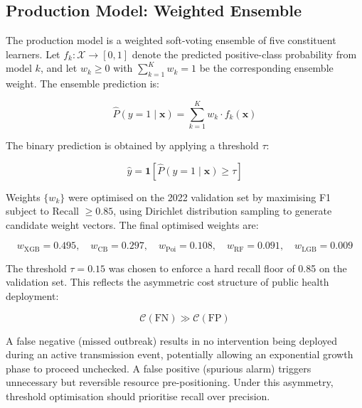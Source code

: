 \documentclass[conference]{IEEEtran}
\begin{document}
\subsection{Production Model: Weighted Ensemble}
\label{subsec:ensemble}

The production model is a weighted soft-voting ensemble of five
constituent learners. Let $f_k : \mathcal{X} \to [0,1]$ denote
the predicted positive-class probability from model $k$, and let
$w_k \geq 0$ with $\sum_{k=1}^{K} w_k = 1$ be the corresponding
ensemble weight. The ensemble prediction is:

\begin{equation}
  \hat{P}(y=1 \mid \mathbf{x}) = \sum_{k=1}^{K} w_k \cdot f_k(\mathbf{x})
  \label{eq:ensemble}
\end{equation}

The binary prediction is obtained by applying a threshold $\tau$:

\begin{equation}
  \hat{y} = \mathbf{1}\!\left[\hat{P}(y=1 \mid \mathbf{x}) \geq \tau\right]
  \label{eq:threshold}
\end{equation}

Weights $\{w_k\}$ were optimised on the 2022 validation set by
maximising F1 subject to Recall $\geq 0.85$, using Dirichlet
distribution sampling to generate candidate weight vectors. The
final optimised weights are:

\begin{equation}
  w_{\text{XGB}} = 0.495,\quad
  w_{\text{CB}}  = 0.297,\quad
  w_{\text{Poi}} = 0.108,\quad
  w_{\text{RF}}  = 0.091,\quad
  w_{\text{LGB}} = 0.009
  \label{eq:weights}
\end{equation}

The threshold $\tau = 0.15$ was chosen to enforce a hard recall
floor of 0.85 on the validation set. This reflects the asymmetric
cost structure of public health deployment:

\begin{equation}
  \mathcal{C}(\text{FN}) \gg \mathcal{C}(\text{FP})
  \label{eq:cost}
\end{equation}

A false negative (missed outbreak) results in no intervention being
deployed during an active transmission event, potentially allowing
an exponential growth phase to proceed unchecked. A false positive
(spurious alarm) triggers unnecessary but reversible resource
pre-positioning. Under this asymmetry, threshold optimisation
should prioritise recall over precision.
\end{document}
